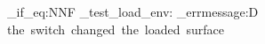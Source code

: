 \documentclass[tikz,border=2pt]{standalone}
\begin{document}
\begingroup
  \tenkzkernel
  \ExplSyntaxOn
  \cs_if_eq:NNF \tenkz \tenkz_test_load_env:
    { \tex_errmessage:D { the~switch~changed~the~loaded~surface } }
  \ExplSyntaxOff
\endgroup
\begin{tenkz}[cols=1]
\end{tenkz}
\end{document}
